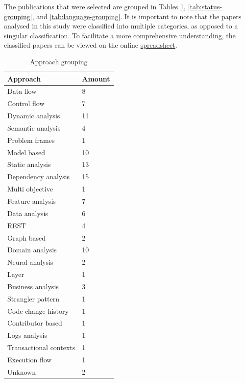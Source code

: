 \documentclass[conference]{IEEEtran}
\begin{document}
The publications that were selected are grouped in Tables
\ref{tab:approach-grouping}, \ref{tab:status-grouping}, and
\ref{tab:language-grouping}. It is important to note that the papers analysed
in this study were classified into multiple categories, as opposed to a
singular classification. To facilitate a more comprehensive understanding, the
classified papers can be viewed on the online
\href{https://example.com}{spreadsheet}.

\begin{table}[!htb] \caption{Approach grouping} \label{tab:approach-grouping}
  \begin{center}
    \begin{tabular}[c]{p{12em}|p{4em}}
      \textbf{Approach} &
      \textbf{Amount} \\
      \hline Data flow & {8} \\
      \hline Control flow & {7} \\
      \hline Dynamic analysis & {11} \\
      \hline Semantic analysis & {4} \\
      \hline Problem frames & {1} \\
      \hline Model based & {10} \\
      \hline Static analysis & {13} \\
      \hline Dependency analysis & {15} \\
      \hline Multi objective & {1} \\
      \hline Feature analysis & {7} \\
      \hline Data analysis & {6} \\
      \hline REST & {4} \\
      \hline Graph based & {2} \\
      \hline Domain analysis & {10} \\
      \hline Neural analysis & {2} \\
      \hline Layer & {1} \\
      \hline Business analysis & {3} \\
      \hline Strangler pattern & {1} \\
      \hline Code change history & {1} \\
      \hline Contributor based & {1} \\
      \hline Logs analysis & {1} \\
      \hline Transactional contexts & {1} \\
      \hline Execution flow & {1} \\
      \hline Unknown & {2} \\
    \end{tabular}
  \end{center}
\end{table}
\end{document}

